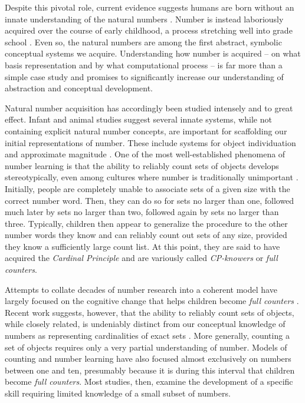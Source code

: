 \documentclass[10pt,letterpaper]{article}
\begin{document}
Despite this pivotal role, current evidence suggests humans are
born without an innate understanding of the natural numbers
\citep{Car2009}. Number is instead laboriously acquired over the
course of early childhood, a process stretching well into grade school
\citep{Nat2010}. Even so, the natural numbers are among the first
abstract, symbolic conceptual systems we acquire. Understanding how
number is acquired -- on what basis representation and by what
computational process -- is far more than a simple case study and
promises to significantly increase our understanding of abstraction
and conceptual development.

Natural number acquisition has accordingly been studied intensely and
to great effect. Infant and animal studies suggest several innate
systems, while not containing explicit natural number concepts, are
important for scaffolding our initial representations of number. These
include systems for object individuation and approximate magnitude
\citep{feigenson2004core,dehaene2011number}. One of the most
well-established phenomena of number learning is that the ability to
reliably count sets of objects develops stereotypically, even among
cultures where number is traditionally unimportant
\citep{Wyn1992,JarPianSpelEtAl2014}. Initially, people are
completely unable to associate sets of a given size with the correct
number word. Then, they can do so for sets no larger than one,
followed much later by sets no larger than two, followed again by
sets no larger than three. Typically, children then appear to
generalize the procedure to the other number words they know and can
reliably count out sets of any size, provided they know a sufficiently
large count list. At this point, they are said to have acquired the
\emph{Cardinal Principle} and are variously called \emph{CP-knowers}
or \emph{full counters}.

Attempts to collate decades of number research into a coherent model
have largely focused on the cognitive change that helps children
become \emph{full counters} \citep{Car2009,PianGoodTen2012}. Recent
work suggests, however, that the ability to reliably count sets of
objects, while closely related, is undeniably distinct from our
conceptual knowledge of numbers as representing cardinalities of exact
sets \citep{DavEngBar2012,izard2014toward,JarPianSpelEtAl2014}. More
generally, counting a set of objects requires only a very partial
understanding of number. Models of counting and number learning have
also focused almost exclusively on numbers between one and ten,
presumably because it is during this interval that children become
\emph{full counters}. Most studies, then, examine the development of a
specific skill requiring limited knowledge of a small subset of
numbers.
\end{document}
